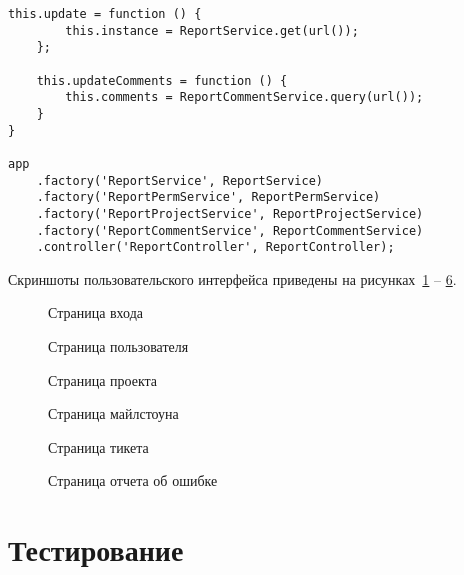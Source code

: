 \begin{lstlisting}[style=crs_js, label={lst:jsController}, caption={Angular-контроллер}]
    this.update = function () {
        this.instance = ReportService.get(url());
    };

    this.updateComments = function () {
        this.comments = ReportCommentService.query(url());
    }
}

app
    .factory('ReportService', ReportService)
    .factory('ReportPermService', ReportPermService)
    .factory('ReportProjectService', ReportProjectService)
    .factory('ReportCommentService', ReportCommentService)
    .controller('ReportController', ReportController);
\end{lstlisting}

Скриншоты пользовательского интерфейса приведены на рисунках~\ref{fig:loginPage} -- \ref{fig:reportPage}.

\begin{figure}[h]
\caption{Страница входа}
\label{fig:loginPage}
\end{figure}
\begin{figure}[h]
\caption{Страница пользователя}
\label{fig:userPage}
\end{figure}
\begin{figure}[h]
\caption{Страница проекта}
\label{fig:projectPage}
\end{figure}
\begin{figure}[h]
\caption{Страница майлстоуна}
\label{fig:milestonePage}
\end{figure}
\begin{figure}[h]
\caption{Страница тикета}
\label{fig:ticketPage}
\end{figure}
\begin{figure}[h]
\caption{Страница отчета об ошибке}
\label{fig:reportPage}
\end{figure}

\section{Тестирование}

